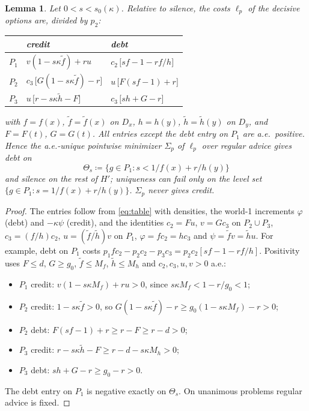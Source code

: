 \documentclass[11pt]{article}
\newtheorem{lemma}[theorem]{Lemma}
\theoremstyle{definition}\newtheorem{definition}[theorem]{Definition}
\theoremstyle{remark}\newtheorem{remark}[theorem]{Remark}
\newcommand{\ftil}{\tilde f}
\newcommand{\htil}{\tilde h}
\begin{document}
\begin{lemma}\label{lem:silent}
Let $0<s<s_0(\kappa)$. Relative to silence, the costs $\ell_p$ of the
decisive options are, divided by $p_2$:
\begin{center}
\begin{tabular}{c|l|l}
 & credit & debt\\\hline
$P_1$ & $v(1-s\kappa\ftil)+ru$ & $c_2\,\bigl[sf-1-rf/h\bigr]$\\
$P_2$ & $c_3\,\bigl[G(1-s\kappa\ftil)-r\bigr]$ & $u\,\bigl[F(sf-1)+r\bigr]$\\
$P_3$ & $u\,\bigl[r-s\kappa\htil-F\bigr]$ & $c_3\,\bigl[sh+G-r\bigr]$
\end{tabular}
\end{center}
with $f=f(x)$, $\ftil=\ftil(x)$ on $D_x$, $h=h(y)$, $\htil=\htil(y)$ on
$D_y$, and $F=F(t)$, $G=G(t)$. All entries except the debt entry on $P_1$
are a.e.\ positive. Hence the a.e.-unique pointwise minimizer $\Sigma_p$ of
$\ell_p$ over regular advice gives debt on
\[
 \Theta_s\coloneqq\{g\in P_1:s<1/f(x)+r/h(y)\}
\]
and silence on the rest of $H'$; uniqueness can fail only on the level set
$\{g\in P_1:s=1/f(x)+r/h(y)\}$. $\Sigma_p$ never gives credit.
\end{lemma}
\begin{proof}
The entries follow from \eqref{eq:table} with densities, the world-1
increments $\varphi$ (debt) and $-\kappa\psi$ (credit), and the identities
$c_2=Fu$, $v=Gc_3$ on $P_2\cup P_3$, $c_3=(f/h)c_2$, $u=(\ftil/\htil)v$ on
$P_1$, $\varphi=fc_2=hc_3$ and $\psi=\ftil v=\htil u$. For example, debt on
$P_1$ costs $p_1fc_2-p_2c_2-p_3c_3=p_2c_2[sf-1-rf/h]$. Positivity uses
$F\le d$, $G\ge g_0$, $\ftil\le M_f$, $\htil\le M_h$ and $c_2,c_3,u,v>0$ a.e.:
\begin{itemize}[leftmargin=*,itemsep=1pt]
\item $P_1$ credit: $v(1-s\kappa M_f)+ru>0$, since $s\kappa M_f<1-r/g_0<1$;
\item $P_2$ credit: $1-s\kappa\ftil>0$, so $G(1-s\kappa\ftil)-r\ge
g_0(1-s\kappa M_f)-r>0$;
\item $P_2$ debt: $F(sf-1)+r\ge r-F\ge r-d>0$;
\item $P_3$ credit: $r-s\kappa\htil-F\ge r-d-s\kappa M_h>0$;
\item $P_3$ debt: $sh+G-r\ge g_0-r>0$.
\end{itemize}
The debt entry on $P_1$ is negative exactly on $\Theta_s$. On unanimous
problems regular advice is fixed.
\end{proof}
\end{document}
